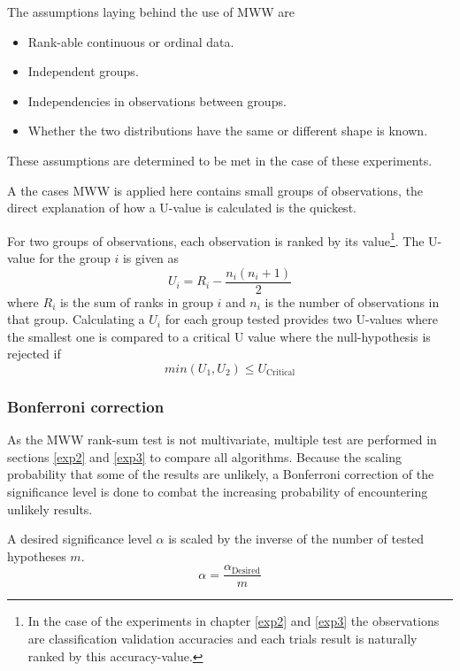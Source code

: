 The assumptions laying behind the use of MWW are 
\begin{itemize}
    \item Rank-able continuous or ordinal data.
    \item Independent groups.
    \item Independencies in observations between groups.
    \item Whether the two distributions have the same or different shape is known. 
\end{itemize}
These assumptions are determined to be met in the case of these experiments. 

A the cases MWW is applied here contains small groups of observations, the direct explanation of how a U-value is calculated is the quickest. 

For two groups of observations, each observation is ranked by its value\footnote{In the case of the experiments in chapter \ref{exp2} and \ref{exp3} the observations are classification validation accuracies and each trials result is naturally ranked by this accuracy-value.}. The U-value for the group \(i\) is given as 
\begin{equation*}
    U_{i} = R_{i}-\frac{n_{i}(n_{i}+1)}{2}
\end{equation*}
where \(R_{i}\) is the sum of ranks in group \(i\) and \(n_{i}\) is the number of observations in that group. 
Calculating a \(U_{i}\) for each group tested provides two U-values where the smallest one is compared to a critical U value where the null-hypothesis is rejected if 
\begin{equation*}
    min(U_{1}, U_{2}) \leq U_{\text{Critical}}
\end{equation*}

\subsubsection{Bonferroni correction}
As the MWW rank-sum test is not multivariate, multiple test are performed in sections \ref{exp2} and \ref{exp3} to compare all algorithms. Because the scaling probability that some of the results are unlikely, a Bonferroni correction of the significance level is done to combat the increasing probability of encountering unlikely results. 

A desired significance level \(\alpha\) is scaled by the inverse of the number of tested hypotheses \(m\). 
\begin{equation*}
    \alpha=\frac{\alpha_{\text{Desired}}}{m}
\end{equation*}

